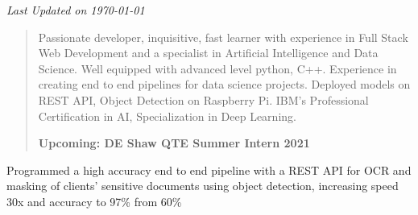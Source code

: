 \documentclass[8pt,a4paper,ragged2e,withhyper]{altacv}
\begin{document}
\begin{paracol}{2}
        \vspace*{\fill}
        \scriptsize\textit{Last Updated on \today}
        
        
        
        \newpage
        
        \switchcolumn
        
            \begin{quote}
                Passionate developer, inquisitive, fast learner with experience in Full Stack Web Development and a specialist in Artificial Intelligence and Data Science. Well equipped with advanced level python, C++. Experience in creating end to end pipelines for data science projects. Deployed models on REST API, Object Detection on Raspberry Pi. IBM's Professional Certification in AI, Specialization in Deep Learning. 
                
                \smallskip
                \textbf{Upcoming: DE Shaw QTE Summer Intern 2021}
            \end{quote}
        
            
            Programmed a high accuracy end to end pipeline with a REST API for OCR and masking of clients' sensitive documents using object detection, increasing speed 30x and accuracy to 97\% from 60\%


\end{paracol}
\end{document}
